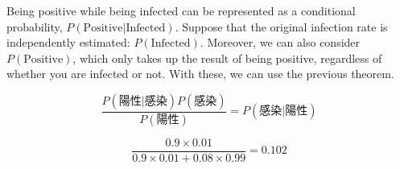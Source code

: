 \documentclass{ltjsbook}
\begin{document}
Being positive while being infected can be represented as a conditional probability, $ P(\mbox{Positive}|\mbox{Infected})$. Suppose that the original infection rate is independently estimated: $ P(\mbox{Infected})$. Moreover, we can also consider $ P(\mbox{Positive}) $, which only takes up the result of being positive, regardless of whether you are infected or not. With these, we can use the previous theorem.

\[ \frac{P(\mbox{陽性}|\mbox{感染})P(\mbox{感染})}{P(\mbox{陽性})} = P(\mbox{感染}|\mbox{陽性}) \]




\[\frac{0.9\times0.01}{0.9\times0.01+0.08\times0.99}=0.102 \]

\end{document}
